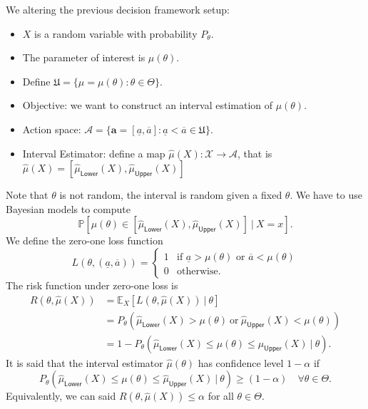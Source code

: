 \begin{example}
    We altering the previous decision framework setup:
    \begin{itemize}
        \item $X$ is a random variable with probability $P_\theta$.
        \item The parameter of interest is $\mu(\theta)$.
        \item Define $\mathfrak{U} = \{ \mu = \mu(\theta) : \theta \in \Theta \}$.
        \item Objective: we want to construct an interval estimation of $\mu(\theta)$.
        \item Action space: $\mathcal{A} = \{ \mathbf{a} = [\underline{a}, \overline{a}] :  \underline{a} < \overline{a} \in \mathfrak{U} \}$.
        \item Interval Estimator: define a map $\hat{\mu}(X) : \mathcal{X} \to \mathcal{A}$, that is 
            $\hat{\mu}(X) = [\hat{\mu}_{\textsf{Lower}}(X), \hat{\mu}_{\textsf{Upper}}(X)]$
    \end{itemize}

    Note that $\theta$ is not random, the interval is random given a fixed $\theta$. We have to use 
    Bayesian models to compute 
    \[
        \mathbb{P} \left[ \mu(\theta) \in [\hat{\mu}_{\textsf{Lower}}(X), \hat{\mu}_{\textsf{Upper}}(X)] \> | \> X = x \right].
    \]
    We define the zero-one loss function
    \[
        L(\theta, (\underline{a}, \overline{a})) = \begin{cases}
            1 & \text{if } \underline{a} > \mu(\theta) \text{ or } \overline{a} < \mu(\theta)\\
            0 & \text{otherwise}.
        \end{cases}
    \]
    The risk function under zero-one loss is 
    \begin{align*}
        R(\theta, \hat{\mu}(X)) &= \mathbb{E}_X[L(\theta, \hat{\mu}(X)) \> | \> \theta]\\
        &= P_\theta \left( \hat{\mu}_{\textsf{Lower}}(X) > \mu(\theta) \> \text{or} \>  
        \hat{\mu}_{\textsf{Upper}}(X) < \mu(\theta) \right)\\
        &= 1 - P_\theta \left( \hat{\mu}_{\textsf{Lower}}(X) \leq \mu(\theta) \leq \hat{\mu}_{\textsf{Upper}}(X) \> | \> \theta \right).
    \end{align*}
    It is said that the interval estimator $\hat{\mu}(\theta)$ has confidence level $1-\alpha$ if 
    \[
    P_\theta \left( \hat{\mu}_{\textsf{Lower}}(X) \leq \mu(\theta) \leq \hat{\mu}_{\textsf{Upper}}(X) \> | \> \theta \right) \geq (1 - \alpha) \quad 
    \forall \theta \in \Theta.
    \]
    Equivalently, we can said $R(\theta, \hat{\mu}(X)) \leq \alpha$ for all $\theta \in \Theta$.
\end{example}


